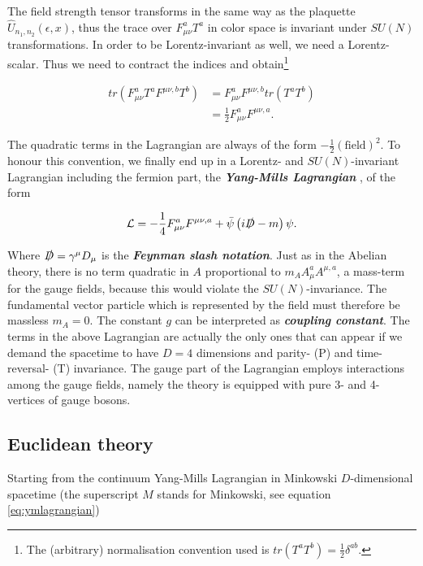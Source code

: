 \documentclass{article}
\theoremstyle{plain} %
\theoremstyle{convention} %
\theoremstyle{remark} %
\def\df#1{\textbf{\textit{#1}}}
\numberwithin{equation}{section}
\begin{document}
The field strength tensor transforms in the same way as the plaquette $\hat{U}_{n_1,n_2}(\epsilon,x)$, thus the trace over $F_{\mu \nu}^a T^a$ in color space is invariant under $SU(N)$ transformations. In order to be Lorentz-invariant as well, we need a Lorentz-scalar. Thus we need to contract the indices and obtain\footnote{The (arbitrary) normalisation convention used is $tr(T^a T^b) = \frac{1}{2} \delta^{ab}$.}

\begin{align}
    tr( F_{\mu \nu}^a T^a F^{\mu \nu, b} T^b) &= F_{\mu \nu}^a F^{\mu \nu, b} tr(T^a T^b) \\
    &= \frac{1}{2} F_{\mu \nu}^a F^{\mu \nu, a}.
\end{align}

The quadratic terms in the Lagrangian are always of the form $-\frac{1}{2} (\text{field})^2$. To honour this convention, we finally end up in a Lorentz- and $SU(N)$-invariant Lagrangian including the fermion part, the \df{Yang-Mills Lagrangian} \cite{yang1954}, of the form

\begin{align}
    \mathcal{L} = -\frac{1}{4} F_{\mu \nu}^a F^{\mu \nu, a} + \bar{\psi} \left( i \slashed{D} - m \right) \psi. \label{eq:ymlagrangian}
\end{align}

Where $\slashed{D} = \gamma^{\mu} D_{\mu}$ is the \df{Feynman slash notation}. Just as in the Abelian theory, there is no term quadratic in $A$ proportional to $m_A A_{\mu}^a A^{\mu,a}$, a mass-term for the gauge fields, because this would violate the $SU(N)$-invariance. The fundamental vector particle which is represented by the field must therefore be massless $m_A = 0$. The constant $g$ can be interpreted as \df{coupling constant}. The terms in the above Lagrangian are actually the only ones that can appear if we demand the spacetime to have $D=4$ dimensions and parity- (P) and time-reversal- (T) invariance. The gauge part of the Lagrangian employs interactions among the gauge fields, namely the theory is equipped with pure 3- and 4-vertices of gauge bosons.

\subsection{Euclidean theory}

Starting from the continuum Yang-Mills Lagrangian in Minkowski $D$-dimensional spacetime (the superscript $M$ stands for Minkowski, see equation \eqref{eq:ymlagrangian})
\end{document}
